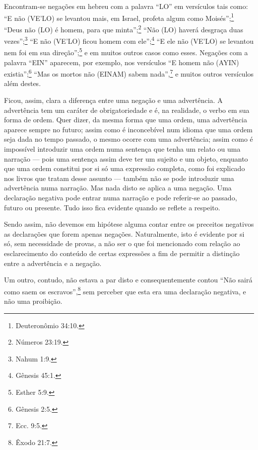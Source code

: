 Encontram-se negações em hebreu com a palavra ``LO'' em versículos tais
como: ``E não (VE'LO) se levantou mais, em Israel, profeta algum como
Moisés'';\footnote{Deuteronômio 34:10.} ``Deus não (LO) é homem, para que minta'';\footnote{Números 23:19.} ``Não (LO) haverá desgraça duas vezes'';\footnote{Nahum 1:9.}
``E não (VE'LO) ficou homem com ele'';\footnote{Gênesis 45:1.} ``E ele não
(VE'LO) se levantou nem foi em sua direção'';\footnote{Esther 5:9.} e em muitos
outros casos como esses. Negações com a palavra ``EIN'' aparecem, por
exemplo, nos versículos ``E homem não (AYIN) existia'';\footnote{Gênesis 2:5.} ``Mas os mortos não (EINAM)
sabem nada'',\footnote{Ecc. 9:5.} e muitos outros versículos além destes.

Ficou, assim, clara a diferença entre uma negação e uma advertência. A
advertência tem um caráter de obrigatoriedade e é, na realidade, o verbo
em sua forma de ordem. Quer dizer, da mesma forma que uma ordem, uma
advertência aparece sempre no futuro; assim como é inconcebível num
idioma que uma ordem seja dada no tempo passado, o mesmo ocorre com uma
advertência; assim como é impossível introduzir uma ordem numa sentença
que tenha um relato ou uma narração --- pois uma sentença assim deve
ter um sujeito e um objeto, enquanto que uma ordem constitui por si só
uma expressão completa, como foi explicado nos livros que tratam desse
assunto --- também não se pode introduzir uma advertência numa narração.
Mas nada disto se aplica a uma negação. Uma declaração negativa pode
entrar numa narração e pode referir-se ao passado, futuro ou presente.
Tudo isso fica evidente quando se reflete a respeito.

Sendo assim, não devemos em hipótese alguma contar entre os preceitos
negativos as declarações que forem apenas negações. Naturalmente, isto é
evidente por si só, sem necessidade de provas, a não ser o que foi
mencionado com relação ao esclarecimento do conteúdo de certas
expressões a fim de permitir a distinção entre a advertência e a
negação.

Um outro, contudo, não estava a par disto e consequentemente contou
``Não sairá como saem os escravos'',\footnote{Êxodo 21:7.} sem perceber que esta
era uma declaração negativa, e não uma proibição.

